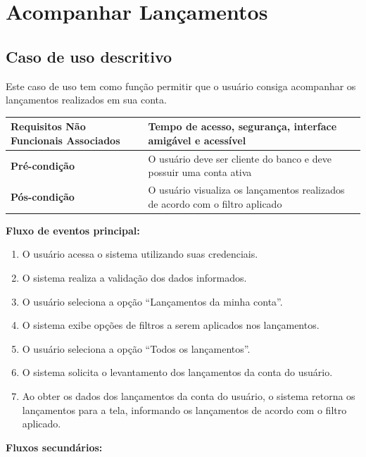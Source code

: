 \section{Acompanhar Lançamentos}

\subsection{Caso de uso descritivo}

Este caso de uso tem como função permitir que o usuário consiga acompanhar os lançamentos realizados em sua conta.

\begin{table}[h]
  \centering
  \begin{tabular}{|p{4cm} | p{10cm} |}
      \hline
      \small{\textbf{Requisitos Não Funcionais Associados}}	&	Tempo de acesso, segurança, interface amigável e acessível	\\ \hline
      \small{\textbf{Pré-condição}}	&	O usuário deve ser cliente do banco e deve possuir uma conta ativa	\\ \hline
      \small{\textbf{Pós-condição}}	&	O usuário visualiza os lançamentos realizados de acordo com o filtro aplicado	\\ \hline
    \end{tabular}
\end{table}

\textbf{Fluxo de eventos principal:}

\begin{enumerate}
  \item O usuário acessa o sistema utilizando suas credenciais.
  \item O sistema realiza a validação dos dados informados.
  \item O usuário seleciona a opção ``Lançamentos da minha conta''.
  \item O sistema exibe opções de filtros a serem aplicados nos lançamentos.
  \item O usuário seleciona a opção ``Todos os lançamentos''.
  \item O sistema solicita o levantamento dos lançamentos da conta do usuário.
  \item Ao obter os dados dos lançamentos da conta do usuário, o sistema retorna os lançamentos para a tela, informando os lançamentos de acordo com o filtro aplicado.
\end{enumerate}

\textbf{Fluxos secundários:}

